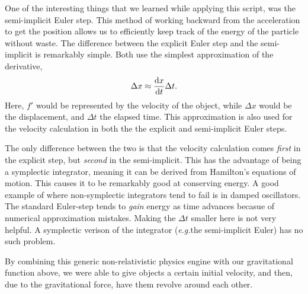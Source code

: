 \documentclass[12pt]{article}
\newcommand{\eg}{\textit{e}.\textit{g.}}
\begin{document}
\inputminted[firstline=29,lastline=55,linenos,fontsize=\footnotesize,bgcolor=codebg]{csharp}{../unity/Assets/Scripts/Engine/MainEngine.cs}

One of the interesting things that we learned while applying this script, was the semi-implicit Euler step. This method of working backward from the acceleration to get the position allows us to efficiently keep track of the energy of the particle without waste. The difference between the explicit Euler step and the semi-implicit is remarkably simple. Both use the simplest approximation of the derivative,
\begin{equation}
\Delta x \approx \dv{x}{t} \Delta t.
\end{equation}
Here, $f'$ would be represented by the velocity of the object, while $\Delta x$ would be the displacement, and $\Delta t$ the elapsed time. This approximation is also used for the velocity calculation in both the the explicit and semi-implicit Euler steps. 

The only difference between the two is that the velocity calculation comes \emph{first} in the explicit step, but \emph{second} in the semi-implicit. This has the advantage of being a symplectic integrator, meaning it can be derived from Hamilton's equations of motion. This causes it to be remarkably good at conserving energy. A good example of where non-symplectic integrators tend to fail is in damped oscillators. The standard Euler-step tends to \emph{gain} energy as time advances becasue of numerical approximation mistakes. Making the $\Delta t$ smaller here is not very helpful. A symplectic verison of the integrator (\eg the semi-implicit Euler) has no such problem.

By combining this generic non-relativistic physics engine with our gravitational function above, we were able to give objects a certain initial velocity, and then, due to the gravitational force, have them revolve around each other. 
\end{document}
